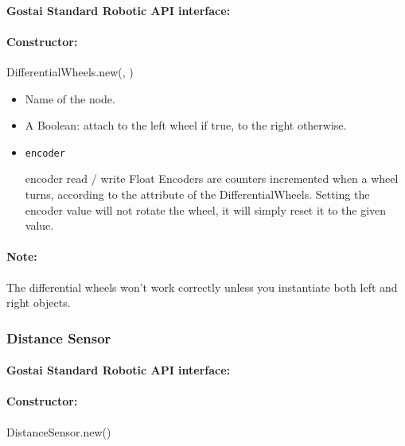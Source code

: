 \paragraph{Gostai Standard Robotic API interface:} 

\paragraph{Constructor: } DifferentialWheels.new(, )

\begin{itemize}
\item {} Name of the \webots node.
\item {} A Boolean: attach to the left wheel if true, to the
  right otherwise.
\end{itemize}

\begin{itemize}

\item \lstinline|encoder|
\begin{attribute}{encoder}
  {read / write}
  {Float}
  {}
  Encoders are counters incremented when a wheel turns, according to
  the  \webots attribute of the
  DifferentialWheels.  Setting the encoder value will not rotate the
  wheel, it will simply reset it to the given value.
\end{attribute}

\end{itemize}

\paragraph{Note:} The differential wheels won't work correctly unless
you instantiate both left and right objects.

\subsubsection{Distance Sensor}

\paragraph{Gostai Standard Robotic API interface:} 

\paragraph{Constructor:} DistanceSensor.new()

